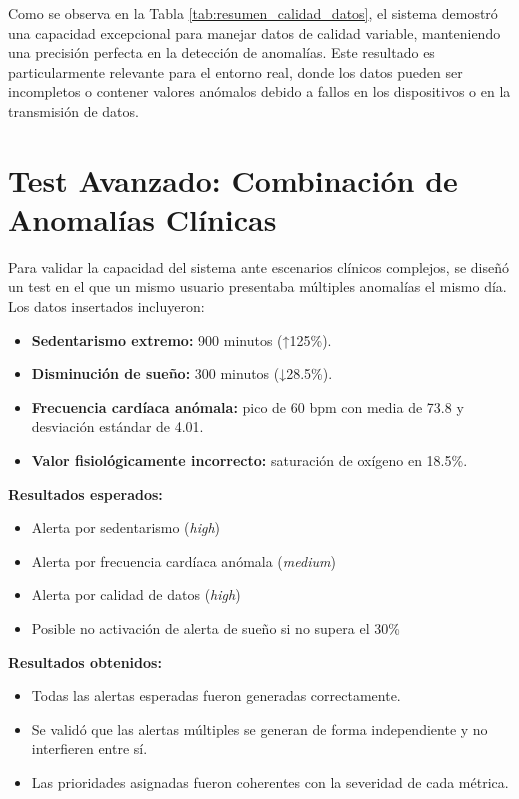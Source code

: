 Como se observa en la Tabla \ref{tab:resumen_calidad_datos}, el sistema demostró una capacidad excepcional para manejar datos de calidad variable, manteniendo una precisión perfecta en la detección de anomalías. Este resultado es particularmente relevante para el entorno real, donde los datos pueden ser incompletos o contener valores anómalos debido a fallos en los dispositivos o en la transmisión de datos.

\section{Test Avanzado: Combinación de Anomalías Clínicas}
\label{sec:test_combinadas}

Para validar la capacidad del sistema ante escenarios clínicos complejos, se diseñó un test en el que un mismo usuario presentaba múltiples anomalías el mismo día. Los datos insertados incluyeron:

\begin{itemize}
    \item \textbf{Sedentarismo extremo:} 900 minutos (↑125\%).
    \item \textbf{Disminución de sueño:} 300 minutos (↓28.5\%).
    \item \textbf{Frecuencia cardíaca anómala:} pico de 60 bpm con media de 73.8 y desviación estándar de 4.01.
    \item \textbf{Valor fisiológicamente incorrecto:} saturación de oxígeno en 18.5\%.
\end{itemize}

\noindent\textbf{Resultados esperados:}
\begin{itemize}
    \item Alerta por sedentarismo (\textit{high})
    \item Alerta por frecuencia cardíaca anómala (\textit{medium})
    \item Alerta por calidad de datos (\textit{high})
    \item Posible no activación de alerta de sueño si no supera el 30\%
\end{itemize}

\noindent\textbf{Resultados obtenidos:}
\begin{itemize}
    \item Todas las alertas esperadas fueron generadas correctamente.
    \item Se validó que las alertas múltiples se generan de forma independiente y no interfieren entre sí.
    \item Las prioridades asignadas fueron coherentes con la severidad de cada métrica.
\end{itemize}

